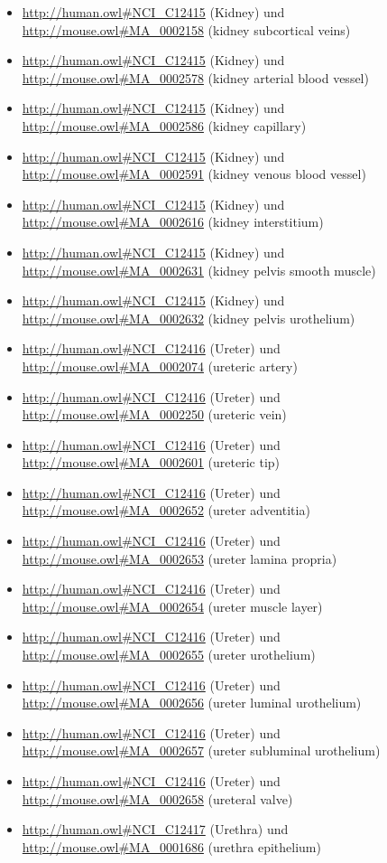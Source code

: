 \begin{itemize}
	\item \url{http://human.owl#NCI_C12415} (Kidney) und \url{http://mouse.owl#MA_0002158} (kidney subcortical veins)
	\item \url{http://human.owl#NCI_C12415} (Kidney) und \url{http://mouse.owl#MA_0002578} (kidney arterial blood vessel)
	\item \url{http://human.owl#NCI_C12415} (Kidney) und \url{http://mouse.owl#MA_0002586} (kidney capillary)
	\item \url{http://human.owl#NCI_C12415} (Kidney) und \url{http://mouse.owl#MA_0002591} (kidney venous blood vessel)
	\item \url{http://human.owl#NCI_C12415} (Kidney) und \url{http://mouse.owl#MA_0002616} (kidney interstitium)
	\item \url{http://human.owl#NCI_C12415} (Kidney) und \url{http://mouse.owl#MA_0002631} (kidney pelvis smooth muscle)
	\item \url{http://human.owl#NCI_C12415} (Kidney) und \url{http://mouse.owl#MA_0002632} (kidney pelvis urothelium)
	\item \url{http://human.owl#NCI_C12416} (Ureter) und \url{http://mouse.owl#MA_0002074} (ureteric artery)
	\item \url{http://human.owl#NCI_C12416} (Ureter) und \url{http://mouse.owl#MA_0002250} (ureteric vein)
	\item \url{http://human.owl#NCI_C12416} (Ureter) und \url{http://mouse.owl#MA_0002601} (ureteric tip)
	\item \url{http://human.owl#NCI_C12416} (Ureter) und \url{http://mouse.owl#MA_0002652} (ureter adventitia)
	\item \url{http://human.owl#NCI_C12416} (Ureter) und \url{http://mouse.owl#MA_0002653} (ureter lamina propria)
	\item \url{http://human.owl#NCI_C12416} (Ureter) und \url{http://mouse.owl#MA_0002654} (ureter muscle layer)
	\item \url{http://human.owl#NCI_C12416} (Ureter) und \url{http://mouse.owl#MA_0002655} (ureter urothelium)
	\item \url{http://human.owl#NCI_C12416} (Ureter) und \url{http://mouse.owl#MA_0002656} (ureter luminal urothelium)
	\item \url{http://human.owl#NCI_C12416} (Ureter) und \url{http://mouse.owl#MA_0002657} (ureter subluminal urothelium)
	\item \url{http://human.owl#NCI_C12416} (Ureter) und \url{http://mouse.owl#MA_0002658} (ureteral valve)
	\item \url{http://human.owl#NCI_C12417} (Urethra) und \url{http://mouse.owl#MA_0001686} (urethra epithelium)

\end{itemize}
